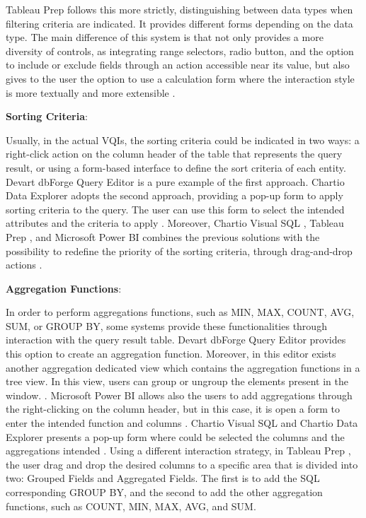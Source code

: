 Tableau Prep \cite{tableauPrep} follows this more strictly, distinguishing between data types when filtering criteria are indicated. It provides different forms depending on the data type. The main difference of this system is that not only provides a more diversity of controls, as integrating range selectors, radio button, and the option to include or exclude fields through an action accessible near its value, but also gives to the user the option to use a calculation form where the interaction style is more textually and more extensible \cite{tableauFilterYourData}.

\textbf{Sorting Criteria}: 

Usually, in the actual \glspl{VQI}, the sorting criteria could be indicated in two ways: a right-click action on the column header of the table that represents the query result, or using a form-based interface to define the sort criteria of each entity. Devart dbForge Query Editor \cite{dbForgeQueryBuilder} is a pure example of the first approach. \cite{dbForgeSortingData} Chartio Data Explorer \cite{chartioDataExplorer} adopts the second approach, providing a pop-up form to apply sorting criteria to the query. The user can use this form to select the intended attributes and the criteria to apply \cite{chartioAdvancedSorting}. Moreover, Chartio Visual SQL \cite{chartioVisualSQL}, Tableau Prep \cite{tableauPrep}, and Microsoft Power BI \cite{powerBI} combines the previous solutions with the possibility to redefine the priority of the sorting criteria, through drag-and-drop actions \cite{visualSqlActions,tableauSortData,powerBIShapeAndCombineData}.

\textbf{Aggregation Functions}: 

In order to perform aggregations functions, such as MIN, MAX, COUNT, AVG, SUM, or GROUP BY, some systems provide these functionalities through interaction with the query result table. Devart dbForge Query Editor \cite{dbForgeQueryBuilder} provides this option to create an aggregation function. Moreover, in this editor exists another aggregation dedicated view which contains the aggregation functions in a tree view. In this view, users can group or ungroup the elements present in the window. \cite{dbForgeGroupingDataInGrid}. Microsoft Power BI \cite{powerBI} allows also the users to add aggregations through the right-clicking on the column header, but in this case, it is open a form to enter the intended function and columns \cite{powerBICommonQueryTasks}. Chartio Visual SQL \cite{chartioVisualSQL} and Chartio Data Explorer \cite{chartioDataExplorer} presents a pop-up form where could be selected the columns and the aggregations intended \cite{chartioDataPipelineSteps}. Using a different interaction strategy, in Tableau Prep \cite{tableauPrep}, the user drag and drop the desired columns to a specific area that is divided into two: Grouped Fields and Aggregated Fields. The first is to add the SQL corresponding GROUP BY, and the second to add the other aggregation functions, such as COUNT, MIN, MAX, AVG, and SUM.

